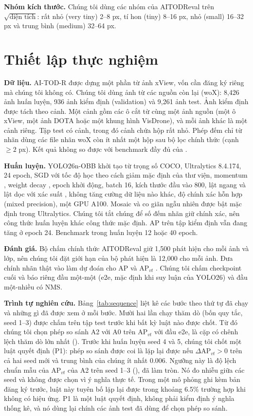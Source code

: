 \documentclass[11pt]{article}
\begin{document}
\textbf{Nhóm kích thước.} Chúng tôi dùng các nhóm của AITODReval trên $\sqrt{\text{diện tích}}$: rất nhỏ (very tiny) 2--8 px,
tí hon (tiny) 8--16 px, nhỏ (small) 16--32 px và trung bình (medium) 32--64 px.

\section{Thiết lập thực nghiệm}
\textbf{Dữ liệu.} AI-TOD-R \cite{aitodr} được dựng một phần từ ảnh xView, vốn cần đăng ký riêng mà chúng tôi không có. Chúng tôi
dùng ảnh từ các nguồn còn lại (woX): 8,426 ảnh huấn luyện, 936 ảnh kiểm định (validation) và 9,261 ảnh test. Ảnh kiểm định được
tách theo cảnh. Một cảnh gồm các ô cắt từ cùng một ảnh nguồn (một ô xView, một ảnh DOTA hoặc một khung hình VisDrone), và mỗi
ảnh khác là một cảnh riêng. Tập test có \nScenesTest{} cảnh, trong đó \nScenesVt{} cảnh chứa hộp rất nhỏ. Phép đếm chỉ từ nhãn
dùng các file nhãn woX còn ít nhất một hộp sau bộ lọc chính thức (cạnh $\geq 2$ px). Kết quả không so được với benchmark đầy đủ
của \cite{aitodr}.

\textbf{Huấn luyện.} YOLO26n-OBB \cite{yolo26} khởi tạo từ trọng số COCO, Ultralytics 8.4.174, 24 epoch, SGD với tốc độ học
\lrZero{} theo cách giảm mặc định của thư viện, momentum \momentum, weight decay \wDecay, \warmup{} epoch khởi động, batch 16, kích
thước đầu vào 800, lật ngang và lật dọc với xác suất \flipP, không tăng cường dữ liệu nào khác, độ chính xác hỗn hợp (mixed
precision), một GPU A100. Mosaic và co giãn ngẫu nhiên được bật mặc định trong Ultralytics. Chúng tôi tắt chúng để số đếm nhãn
giữ chính xác, nên công thức huấn luyện khác công thức mặc định. AP trên tập kiểm định vẫn đang tăng ở epoch 24. Benchmark trong
\cite{aitodr} huấn luyện 12 hoặc 40 epoch.

\textbf{Đánh giá.} Bộ chấm chính thức AITODReval giữ 1,500 phát hiện cho mỗi ảnh và lớp, nên chúng tôi đặt giới hạn của bộ phát
hiện là 12,000 cho mỗi ảnh. Đưa chính nhãn thật vào làm dự đoán cho AP \oracleAP{} và AP$_{vt}$ \oracleVt{}. Chúng tôi chấm
checkpoint cuối và báo riêng đầu một-một (e2e, mặc định khi suy luận của YOLO26) và đầu một-nhiều có NMS.

\textbf{Trình tự nghiên cứu.} Bảng~\ref{tab:sequence} liệt kê các bước theo thứ tự đã chạy và những gì đã được xem ở mỗi bước.
Mười hai lần chạy thăm dò (bốn quy tắc, seed 1--3) được chấm trên tập test trước khi bất kỳ luật nào được chốt. Từ đó chúng tôi
chọn phép so sánh A2 với A0 trên AP$_{vt}$ với đầu e2e, là cặp có chênh lệch thăm dò lớn nhất (\dAvtAtwo{}). Trước khi huấn luyện
seed 4 và 5, chúng tôi chốt một luật quyết định (P1): phép so sánh được coi là lặp lại được nếu $\Delta$AP$_{vt}>0$ trên cả hai
seed mới và trung bình của chúng ít nhất 0.006. Ngưỡng này là độ lệch chuẩn mẫu của AP$_{vt}$ của A2 trên seed 1--3
(\aTwoOldSd), đã làm tròn. Nó đo nhiễu giữa các seed và không được chọn vì ý nghĩa thực tế. Trong một mô phỏng ghi kèm bản đăng
ký trước, luật này tuyên bố lặp lại được trong khoảng 6.5\% trường hợp khi không có hiệu ứng. P1 là một luật quyết định, không
phải kiểm định ý nghĩa thống kê, và nó dùng lại chính các ảnh test đã dùng để chọn phép so sánh.
\end{document}
